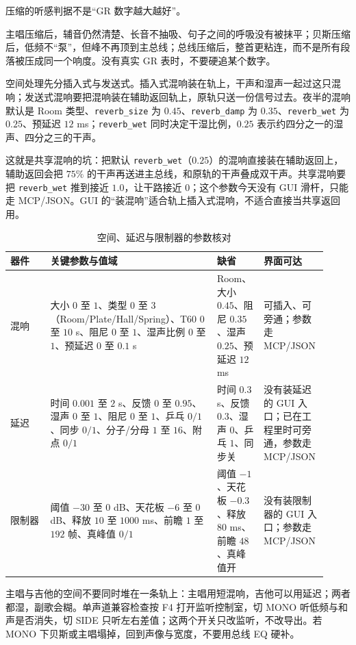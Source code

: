 压缩的听感判据不是“GR 数字越大越好”。


主唱压缩后，辅音仍然清楚、长音不抽吸、句子之间的呼吸没有被抹平；贝斯压缩后，低频不“泵”，但峰不再顶到主总线；总线压缩后，整首更粘连，而不是所有段落被压成同一个响度。没有真实 GR 表时，不要硬追某个数字。

空间处理先分插入式与发送式。插入式混响装在轨上，干声和湿声一起过这只混响；发送式混响要把混响装在辅助返回轨上，原轨只送一份信号过去。夜半的混响默认是 Room 类型、\texttt{reverb\_size} 为 $0.45$、\texttt{reverb\_damp} 为 $0.35$、\texttt{reverb\_wet} 为 $0.25$、预延迟 $12$ ms；\texttt{reverb\_wet} 同时决定干湿比例，$0.25$ 表示约四分之一的湿声、四分之三的干声。

这就是共享混响的坑：把默认 \texttt{reverb\_wet}（$0.25$）的混响直接装在辅助返回上，辅助返回会把 $75\%$ 的干声再送进主总线，和原轨的干声叠成双干声。共享混响要把 \texttt{reverb\_wet} 推到接近 $1.0$，让干路接近 $0$；这个参数今天没有 GUI 滑杆，只能走 MCP/JSON。GUI 的“装混响”适合轨上插入式混响，不适合直接当共享返回用。

\begin{table}[htbp]
\centering
\small
\begin{tabular}{@{}p{0.12\linewidth}p{0.50\linewidth}p{0.14\linewidth}p{0.16\linewidth}@{}}
\hline
器件 & 关键参数与值域 & 缺省 & 界面可达 \\
\hline
混响 & 大小 $0$ 至 $1$、类型 $0$ 至 $3$（Room/Plate/Hall/Spring）、T60 $0$ 至 $10$ s、阻尼 $0$ 至 $1$、湿声比例 $0$ 至 $1$、预延迟 $0$ 至 $0.1$ s & Room、大小 $0.45$、阻尼 $0.35$、湿声 $0.25$、预延迟 $12$ ms & 可插入、可旁通；参数走 MCP/JSON \\
延迟 & 时间 $0.001$ 至 $2$ s、反馈 $0$ 至 $0.95$、湿声 $0$ 至 $1$、阻尼 $0$ 至 $1$、乒乓 $0/1$、同步 $0/1$、分子/分母 $1$ 至 $16$、附点 $0/1$ & 时间 $0.3$ s、反馈 $0.3$、湿声 $0$、乒乓 $1$、同步关 & 没有装延迟的 GUI 入口；已在工程里时可旁通，参数走 MCP/JSON \\
限制器 & 阈值 $-30$ 至 $0$ dB、天花板 $-6$ 至 $0$ dB、释放 $10$ 至 $1000$ ms、前瞻 $1$ 至 $192$ 帧、真峰值 $0/1$ & 阈值 $-1$、天花板 $-0.3$、释放 $80$ ms、前瞻 $48$、真峰值开 & 没有装限制器的 GUI 入口；参数走 MCP/JSON \\
\hline
\end{tabular}
\caption{空间、延迟与限制器的参数核对}
\label{tab:walk-space-limiter}
\end{table}

主唱与吉他的空间不要同时堆在一条轨上：主唱用短混响，吉他可以用延迟；两者都湿，副歌会糊。单声道兼容检查按 F4 打开监听控制室，切 MONO 听低频与和声是否消失，切 SIDE 只听左右差值；这两个开关只改监听，不改导出。若 MONO 下贝斯或主唱塌掉，回到声像与宽度，不要用总线 EQ 硬补。

